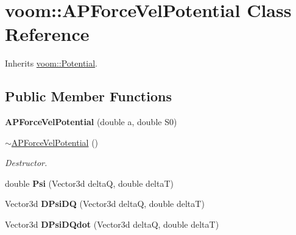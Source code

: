 \hypertarget{classvoom_1_1_a_p_force_vel_potential}{
\section{voom::APForceVelPotential Class Reference}
\label{classvoom_1_1_a_p_force_vel_potential}
}


Inherits \hyperlink{classvoom_1_1_potential}{voom::Potential}.\subsection*{Public Member Functions}
\begin{DoxyCompactItemize}
\item 
\hypertarget{classvoom_1_1_a_p_force_vel_potential_a59690d6c6787b379385119fbf8fee19e}{
{\bfseries APForceVelPotential} (double a, double S0)}
\label{classvoom_1_1_a_p_force_vel_potential_a59690d6c6787b379385119fbf8fee19e}

\item 
\hypertarget{classvoom_1_1_a_p_force_vel_potential_a09a246efb7ca4d455ae6d5c2bd3f94dd}{
\hyperlink{classvoom_1_1_a_p_force_vel_potential_a09a246efb7ca4d455ae6d5c2bd3f94dd}{$\sim$APForceVelPotential} ()}
\label{classvoom_1_1_a_p_force_vel_potential_a09a246efb7ca4d455ae6d5c2bd3f94dd}

\begin{DoxyCompactList}\small\item\em Destructor. \item\end{DoxyCompactList}\item 
\hypertarget{classvoom_1_1_a_p_force_vel_potential_a19a25d9ac9d4c40bd1e1dafa207ee80f}{
double {\bfseries Psi} (Vector3d deltaQ, double deltaT)}
\label{classvoom_1_1_a_p_force_vel_potential_a19a25d9ac9d4c40bd1e1dafa207ee80f}

\item 
\hypertarget{classvoom_1_1_a_p_force_vel_potential_a3ff31adc497d4b0e799c49fcf617d1e0}{
Vector3d {\bfseries DPsiDQ} (Vector3d deltaQ, double deltaT)}
\label{classvoom_1_1_a_p_force_vel_potential_a3ff31adc497d4b0e799c49fcf617d1e0}

\item 
\hypertarget{classvoom_1_1_a_p_force_vel_potential_ad2b6b7988f7defacb41bc468ce37f7ef}{
Vector3d {\bfseries DPsiDQdot} (Vector3d deltaQ, double deltaT)}
\label{classvoom_1_1_a_p_force_vel_potential_ad2b6b7988f7defacb41bc468ce37f7ef}


\end{DoxyCompactItemize}
